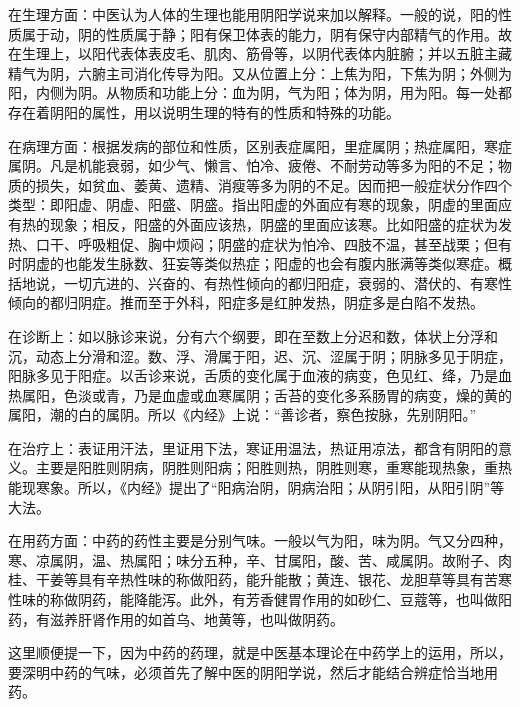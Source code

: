 \documentclass[12pt,UTF8]{ctexbook}
\begin{document}
在生理方面：中医认为人体的生理也能用阴阳学说来加以解释。一般的说，阳的性质属于动，阴的性质属于静；阳有保卫体表的能力，阴有保守内部精气的作用。故在生理上，以阳代表体表皮毛、肌肉、筋骨等，以阴代表体内脏腑；并以五脏主藏精气为阴，六腑主司消化传导为阳。又从位置上分：上焦为阳，下焦为阴；外侧为阳，内侧为阴。从物质和功能上分：血为阴，气为阳；体为阴，用为阳。每一处都存在着阴阳的属性，用以说明生理的特有的性质和特殊的功能。

在病理方面：根据发病的部位和性质，区别表症属阳，里症属阴；热症属阳，寒症属阴。凡是机能衰弱，如少气、懒言、怕冷、疲倦、不耐劳动等多为阳的不足；物质的损失，如贫血、萎黄、遗精、消瘦等多为阴的不足。因而把一般症状分作四个类型：即阳虚、阴虚、阳盛、阴盛。指出阳虚的外面应有寒的现象，阴虚的里面应有热的现象；相反，阳盛的外面应该热，阴盛的里面应该寒。比如阳盛的症状为发热、口干、呼吸粗促、胸中烦闷；阴盛的症状为怕冷、四肢不温，甚至战栗；但有时阴虚的也能发生脉数、狂妄等类似热症；阳虚的也会有腹内胀满等类似寒症。概括地说，一切亢进的、兴奋的、有热性倾向的都归阳症，衰弱的、潜伏的、有寒性倾向的都归阴症。推而至于外科，阳症多是红肿发热，阴症多是白陷不发热。

在诊断上：如以脉诊来说，分有六个纲要，即在至数上分迟和数，体状上分浮和沉，动态上分滑和涩。数、浮、滑属于阳，迟、沉、涩属于阴；阴脉多见于阴症，阳脉多见于阳症。以舌诊来说，舌质的变化属于血液的病变，色见红、绛，乃是血热属阳，色淡或青，乃是血虚或血寒属阴；舌苔的变化多系肠胃的病变，燥的黄的属阳，潮的白的属阴。所以《内经》上说：“善诊者，察色按脉，先别阴阳。”

在治疗上：表证用汗法，里证用下法，寒证用温法，热证用凉法，都含有阴阳的意义。主要是阳胜则阴病，阴胜则阳病；阳胜则热，阴胜则寒，重寒能现热象，重热能现寒象。所以，《内经》提出了“阳病治阴，阴病治阳；从阴引阳，从阳引阴”等大法。

在用药方面：中药的药性主要是分别气味。一般以气为阳，味为阴。气又分四种，寒、凉属阴，温、热属阳；味分五种，辛、甘属阳，酸、苦、咸属阴。故附子、肉桂、干姜等具有辛热性味的称做阳药，能升能散；黄连、银花、龙胆草等具有苦寒性味的称做阴药，能降能泻。此外，有芳香健胃作用的如砂仁、豆蔻等，也叫做阳药，有滋养肝肾作用的如首乌、地黄等，也叫做阴药。

这里顺便提一下，因为中药的药理，就是中医基本理论在中药学上的运用，所以，要深明中药的气味，必须首先了解中医的阴阳学说，然后才能结合辨症恰当地用药。
\end{document}
